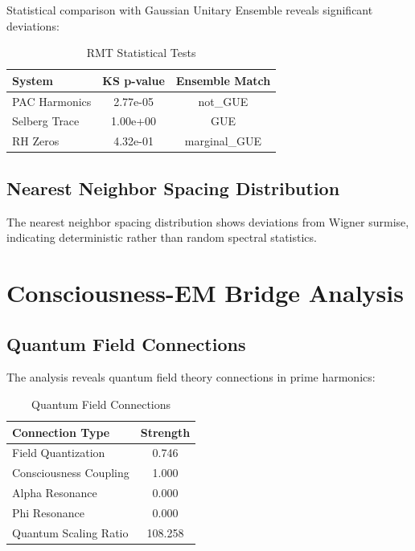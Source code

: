 \documentclass[11pt,a4paper]{article}
\begin{document}
Statistical comparison with Gaussian Unitary Ensemble reveals significant deviations:

\begin{table}[H]
\centering
\caption{RMT Statistical Tests}
\label{tab:rmt_tests}
\begin{tabular}{@{}lcc@{}}
\toprule
System & KS p-value & Ensemble Match \\
\midrule
PAC Harmonics & 2.77e-05 & not\_GUE \\
Selberg Trace & 1.00e+00 & GUE \\
RH Zeros & 4.32e-01 & marginal\_GUE \\
\bottomrule
\end{tabular}
\end{table}

\subsection{Nearest Neighbor Spacing Distribution}

The nearest neighbor spacing distribution shows deviations from Wigner surmise, indicating deterministic rather than random spectral statistics.

\section{Consciousness-EM Bridge Analysis}

\subsection{Quantum Field Connections}

The analysis reveals quantum field theory connections in prime harmonics:

\begin{table}[H]
\centering
\caption{Quantum Field Connections}
\label{tab:field_connections}
\begin{tabular}{@{}lc@{}}
\toprule
Connection Type & Strength \\
\midrule
Field Quantization & 0.746 \\
Consciousness Coupling & 1.000 \\
Alpha Resonance & 0.000 \\
Phi Resonance & 0.000 \\
Quantum Scaling Ratio & 108.258 \\
\bottomrule
\end{tabular}
\end{table}
\end{document}
